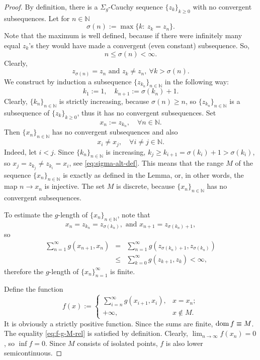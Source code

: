 \documentclass[12pt]{article}
\def\dom{\mathop{\rm dom}}
\newcommand{\N}{\mathbb{N}}
\newcommand{\be}{\begin{equation}}
\newcommand{\ee}{\end{equation}}
\begin{document}
\begin{proof}
    By definition, there is a $\Sigma_g$-Cauchy sequence $\{ z_k\}_{k\ge 0}$ with no convergent subsequences. Let for $n\in\mathbb{N}$
    $$
        \sigma(n) := \max \{k:\ z_k = z_n\}.
    $$
    Note that the maximum is well defined, because if there were infinitely many equal $z_k$'s they would have made a convergent (even constant) subsequence. So,
    $$
        n \le \sigma(n) < \infty.
    $$
    Clearly,
    \begin{equation}
        \label{eq:sigma-alt-def}
        z_{\sigma(n)} = z_n\text{ and }z_k\neq z_n,\ \forall k > \sigma(n).
    \end{equation}
    We construct by induction a subsequence $\{ z_{k_n}\}_{n\in\mathbb{N}}$ in the following way:
     $$
        k_1 := 1,\quad  k_{n+1} := \sigma(k_n) + 1.
    $$
    Clearly, $\{k_n\}_{n\in\N}$ is strictly increasing, because $\sigma(n)\ge n$, so $\{z_{k_n}\}_{n\in\N}$ is a subsequence of  $\{ z_k\}_{k\ge 0}$, thus it has no convergent subsequences. Set
    $$
        x_n := z_{k_n}, \quad\forall n\in\mathbb{N}.
    $$
    Then $\{x_n\}_{n\in\mathbb{N}}$ has no convergent subsequences and also
    $$
        x_i \neq x_j,\quad\forall i\neq j \in \mathbb{N}.
    $$
    Indeed, let $i < j$. Since $\{k_n\}_{n\in\N}$ is  increasing, $k_j \ge k_{i+1} =  \sigma (k_i) + 1 > \sigma (k_i)$, so $x_j = z_{k_j} \neq z_{k_i}=x_i$, see \eqref{eq:sigma-alt-def}. This means that the range $M$ of the sequence $\{x_n\}_{n\in\mathbb{N}}$ is exactly as defined in the Lemma, or, in other words, the map $n\to x_n$ is injective. The set $M$ is discrete, because  $\{x_n\}_{n\in\mathbb{N}}$ has no convergent subsequences.

    To estimate the $g$-length of $\{x_n\}_{n\in\mathbb{N}}$, note that
    $$
        x_n = z_{k_n} = z_{\sigma(k_n)},\text{ and }x_{n+1} = z_{\sigma(k_n)+1},
    $$
    so
    \begin{eqnarray*}
        \sum_{n=1}^\infty g(x_{n+1},x_n) &=& \sum_{n=1}^\infty g(z_{\sigma(k_n)+1},z_{\sigma(k_n)}) \\
        &\le& \sum_{k=0}^\infty g(z_{k+1},z_k) < \infty,
    \end{eqnarray*}
    therefore the $g$-length of $\{x_n\}_{n=1}^\infty$ is finite.

    Define the function
\be\label{eq:f}
f(x):= \left \{\begin{array}{rl} \sum_{i=n}^{\infty} g(x_{i+1},x_{i}), & x = x_{n};  \\
+\infty, & x\notin M.\end{array} \right.
\ee
It is obviously a   strictly positive function. Since the sums are finite, $\dom f\equiv M$. The equality \eqref{eq:f-g-M-rel} is satisfied by definition. Clearly, $\lim_{n\to\infty} f(x_n) = 0$, so $\inf f = 0$. Since $M$ consists of isolated points, $f$ is also lower semicontinuous.
\end{proof}
\end{document}
